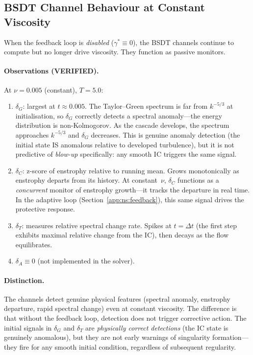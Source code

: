\subsection{BSDT Channel Behaviour at Constant Viscosity}
\label{app:ns:channels_const}

When the feedback loop is \emph{disabled} ($\gamma^* \equiv 0$),
the BSDT channels continue to compute but no longer drive
viscosity.  They function as passive monitors.

\paragraph{Observations (VERIFIED).}
At $\nu = 0.005$ (constant), $T=5.0$:
\begin{enumerate}
\item $\delta_G$: largest at $t \approx 0.005$.  The
  Taylor--Green spectrum is far from $k^{-5/3}$ at
  initialisation, so $\delta_G$ correctly detects a
  spectral anomaly---the energy distribution is non-Kolmogorov.
  As the cascade develops, the spectrum approaches $k^{-5/3}$
  and $\delta_G$ decreases.  This is genuine anomaly detection
  (the initial state IS anomalous relative to developed
  turbulence), but it is not predictive of \emph{blow-up}
  specifically: any smooth IC triggers the same signal.

\item $\delta_C$: z-score of enstrophy relative to running mean.
  Grows monotonically as enstrophy departs from its history.
  At constant~$\nu$, $\delta_C$ functions as a \emph{concurrent}
  monitor of enstrophy growth---it tracks the departure in real
  time.  In the adaptive loop (Section~\ref{app:ns:feedback}),
  this same signal drives the protective response.

\item $\delta_T$: measures relative spectral change rate.
  Spikes at $t = \Delta t$ (the first step exhibits maximal
  relative change from the IC), then decays as the flow
  equilibrates.

\item $\delta_A \equiv 0$ (not implemented in the solver).
\end{enumerate}

\paragraph{Distinction.}
The channels detect genuine physical features (spectral
anomaly, enstrophy departure, rapid spectral change)
even at constant viscosity.  The difference is that
without the feedback loop, detection does not trigger
corrective action.  The initial signals in $\delta_G$
and $\delta_T$ are \emph{physically correct detections}
(the IC state is genuinely anomalous), but they are not
early warnings of singularity formation---they fire for
any smooth initial condition, regardless of subsequent
regularity.

